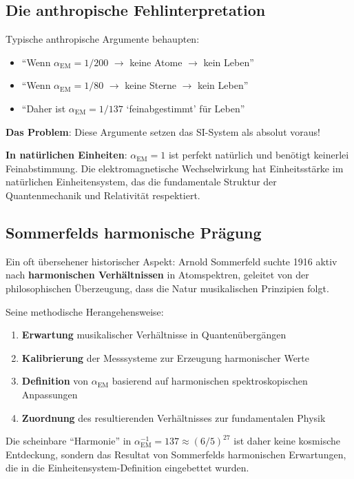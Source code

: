 \documentclass[12pt,a4paper]{article}
\begin{document}
\subsection{Die anthropische Fehlinterpretation}
\label{subsec:anthropic_fallacy}

Typische anthropische Argumente behaupten:
\begin{itemize}
	\item ``Wenn $\alpha_{\text{EM}} = 1/200$ $\rightarrow$ keine Atome $\rightarrow$ kein Leben''
	\item ``Wenn $\alpha_{\text{EM}} = 1/80$ $\rightarrow$ keine Sterne $\rightarrow$ kein Leben''
	\item ``Daher ist $\alpha_{\text{EM}} = 1/137$ `feinabgestimmt' für Leben''
\end{itemize}

\textbf{Das Problem}: Diese Argumente setzen das SI-System als absolut voraus!

\textbf{In natürlichen Einheiten}: $\alpha_{\text{EM}} = 1$ ist perfekt natürlich und benötigt keinerlei Feinabstimmung. Die elektromagnetische Wechselwirkung hat Einheitsstärke im natürlichen Einheitensystem, das die fundamentale Struktur der Quantenmechanik und Relativität respektiert.

\subsection{Sommerfelds harmonische Prägung}
\label{subsec:sommerfeld_harmonic}

Ein oft übersehener historischer Aspekt: Arnold Sommerfeld suchte 1916 aktiv nach \textbf{harmonischen Verhältnissen} in Atomspektren, geleitet von der philosophischen Überzeugung, dass die Natur musikalischen Prinzipien folgt.

Seine methodische Herangehensweise:
\begin{enumerate}
	\item \textbf{Erwartung} musikalischer Verhältnisse in Quantenübergängen
	\item \textbf{Kalibrierung} der Messsysteme zur Erzeugung harmonischer Werte
	\item \textbf{Definition} von $\alpha_{\text{EM}}$ basierend auf harmonischen spektroskopischen Anpassungen
	\item \textbf{Zuordnung} des resultierenden Verhältnisses zur fundamentalen Physik
\end{enumerate}

Die scheinbare ``Harmonie'' in $\alpha_{\text{EM}}^{-1} = 137 \approx (6/5)^{27}$ ist daher keine kosmische Entdeckung, sondern das Resultat von Sommerfelds harmonischen Erwartungen, die in die Einheitensystem-Definition eingebettet wurden.
\end{document}
